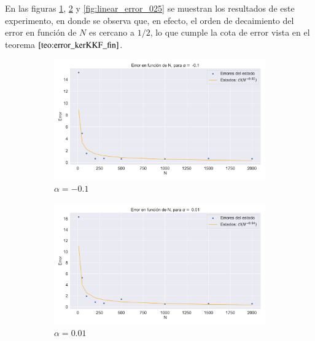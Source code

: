 En las figuras \ref{fig:linear_error_01}, \ref{fig:linear_error_001} y \ref{fig:linear_error_025} se muestran los resultados de este experimento, en donde se observa que, en efecto, el orden de decaimiento del error en función de $N$ es cercano a $1/2$, lo que cumple la cota de error vista en el teorema $\ref{teo:error_kerKKF_fin}$.

\begin{figure}[h!]
    \centering
    \begin{subfigure}[b]{0.49\textwidth}
        \includegraphics[width=\linewidth]{img/content/chapter4/linear_error_01.pdf}
    \caption{$\alpha = -0.1$}
    \label{fig:linear_error_01}
    \end{subfigure}
     \begin{subfigure}[b]{0.49\textwidth}
         \includegraphics[width=\linewidth]{img/content/chapter4/linear_error_001.pdf}
    \caption{$\alpha = 0.01$}
    \label{fig:linear_error_001}
    \end{subfigure}
     \begin{subfigure}[b]{0.49\textwidth}

\end{subfigure}
\end{figure}

